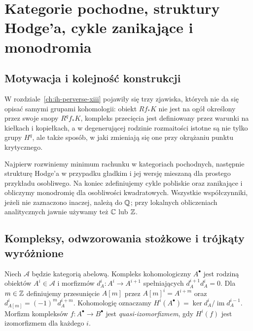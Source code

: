 \chapter{Kategorie pochodne, struktury Hodge'a, cykle zanikające i monodromia}
\label{ch:xiv-hodge-monodromia}

\section{Motywacja i kolejność konstrukcji}
W rozdziale~\ref{ch:ih-perverse-xiii} pojawiły się trzy zjawiska,
których nie da się opisać samymi grupami kohomologii:
obiekt $Rf_*K$ nie jest na ogół określony przez swoje snopy
$R^qf_*K$, kompleks przecięcia jest definiowany przez
warunki na kiełkach i kopiełkach, a w degenerującej rodzinie
rozmaitości istotne są nie tylko grupy $H^q$, ale także sposób,
w jaki zmieniają się one przy okrążaniu punktu krytycznego.

Najpierw rozwiniemy minimum rachunku w kategoriach pochodnych,
następnie strukturę Hodge'a w przypadku gładkim i jej wersję
mieszaną dla prostego przykładu osobliwego. Na koniec
zdefiniujemy cykle pobliskie oraz zanikające i obliczymy
monodromię dla osobliwości kwadratowych.
Wszystkie współczynniki, jeżeli nie zaznaczono inaczej, należą
do $\mathbb{Q}$; przy lokalnych obliczeniach analitycznych jawnie
używamy też $\mathbb{C}$ lub $\mathbb{Z}$.

\section{Kompleksy, odwzorowania stożkowe i trójkąty wyróżnione}
\begin{definicja}
Niech $\mathcal A$ będzie kategorią abelową. Kompleks
kohomologiczny $A^\bullet$ jest rodziną obiektów
$A^i\in\mathcal A$ i morfizmów
$d_A^i:A^i\to A^{i+1}$ spełniających
$d_A^{i+1}d_A^i=0$. Dla $m\in\mathbb{Z}$ definiujemy
przesunięcie $A[m]$ przez
$A[m]^i=A^{i+m}$ oraz $d_{A[m]}^i=(-1)^m d_A^{i+m}$.
Kohomologię oznaczamy
$H^i(A^\bullet)=\ker d_A^i/\operatorname{im}d_A^{i-1}$.
Morfizm kompleksów $f:A^\bullet\to B^\bullet$ jest
\emph{quasi-izomorfizmem}, gdy $H^i(f)$ jest izomorfizmem
dla każdego $i$.
\end{definicja}

